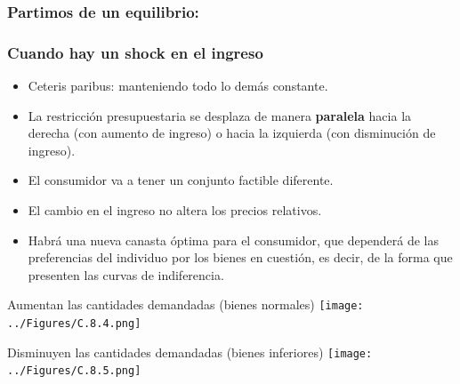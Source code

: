 \documentclass{beamer}
\begin{document}
\begin{frame}
\frametitle{Partimos de un equilibrio:}
\begin{center}
\begin{figure}[H]
\renewcommand{\figurename}{Figure}
\begin{center}
\end{center}
\end{figure}
\end{center}
\end{frame}

\begin{frame}
\frametitle{Cuando hay un shock en el ingreso}
\begin{itemize}
    \item Ceteris paribus: manteniendo todo lo demás constante.
    \item La restricción presupuestaria se desplaza de manera \textbf{paralela} hacia la derecha (con aumento de ingreso) o hacia la izquierda (con disminución de ingreso).
    \item El consumidor va a tener un conjunto factible diferente.
    \item El cambio en el ingreso no altera los precios relativos.
    \item Habrá una nueva canasta óptima para el consumidor, que dependerá de las preferencias del individuo por los bienes en cuestión, es decir, de la forma que presenten las curvas de indiferencia. 
\end{itemize}
\end{frame}

\begin{frame}{Aumentan las cantidades demandadas (bienes normales)}
    \centering
    \texttt{[image: ../Figures/C.8.4.png]}
\end{frame}

\begin{frame}{Disminuyen las cantidades demandadas (bienes inferiores)}
    \centering
    \texttt{[image: ../Figures/C.8.5.png]}
\end{frame}
\end{document}
